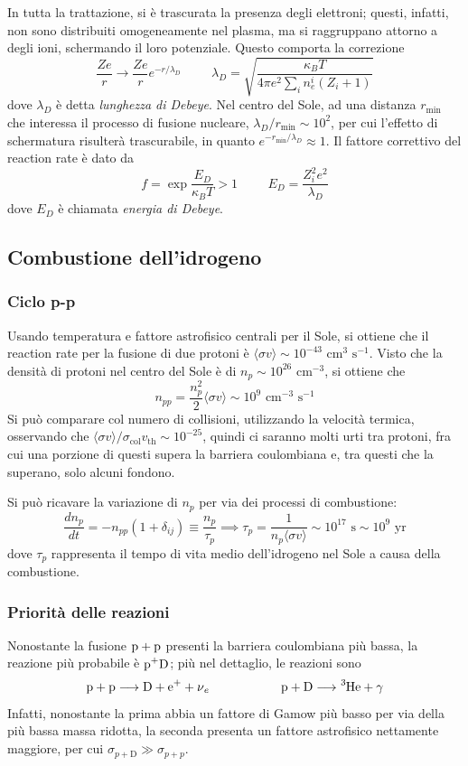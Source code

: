 \documentclass[11pt, a4paper]{scrartcl}
\theoremstyle{style}
\theoremstyle{style1}
\numberwithin{equation}{subsection}
\begin{document}
In tutta la trattazione, si \`e trascurata la presenza degli elettroni; questi, infatti, non sono distribuiti omogeneamente nel plasma, ma si raggruppano attorno a degli ioni, schermando il loro potenziale.
Questo comporta la correzione 
\[
\frac{Ze}{r} \longrightarrow \frac{Ze}{r} e^{-r / \lambda _D} \hspace{1cm} \lambda _D = \sqrt{\frac{\kappa _B T}{4 \pi e^2 \sum_{i}^{} n_e^i (Z_i+1)}} 
\] 
dove $\lambda _D$ \`e detta \textit{lunghezza di Debeye}.
Nel centro del Sole, ad una distanza $r_\text{min}$ che interessa il processo di fusione nucleare, $\lambda _D / r_\text{min}\sim 10^2$, per cui l'effetto di schermatura risulter\`a trascurabile, in quanto $e^{- r_\text{min} / \lambda _D} \approx 1$.
Il fattore correttivo del reaction rate \`e dato da
\[
f = \exp \frac{E_D}{ \kappa _B T } > 1 \hspace{1cm} E_D = \frac{Z_i^2 e^2}{\lambda _D}
\] 
dove $E_D$ \`e chiamata \textit{energia di Debeye}.

\subsection{Combustione dell'idrogeno}
\subsubsection{Ciclo p-p}
Usando temperatura e fattore astrofisico centrali per il Sole, si ottiene che il reaction rate per la fusione di due protoni \`e $\langle \sigma v \rangle \sim 10^{-43} \text{ cm}^3 \text{ s}^{-1}$.
Visto che la densit\`a di protoni nel centro del Sole \`e di $n_p \sim 10^{26} \text{ cm}^{-3}$, si ottiene che
\[
n_{p p} = \frac{n_p^2}{2} \langle \sigma v \rangle \sim 10^{9} \text{ cm}^{-3} \text{ s}^{-1}
\] 
Si pu\`o comparare col numero di collisioni, utilizzando la velocit\`a termica, osservando che $\langle \sigma v \rangle / \sigma _\text{col} v_\text{th} \sim 10^{-25}$, quindi ci saranno molti urti tra protoni, fra cui una porzione di questi supera la barriera coulombiana e, tra questi che la superano, solo alcuni fondono.

Si pu\`o ricavare la variazione di $n_p$ per via dei processi di combustione:
\[
\frac{d n_p}{d t} = - n_{pp} (1+ \delta _{ij} ) \equiv \frac{n_p}{\tau _p}\implies \tau _p = \frac{1}{n_p \langle \sigma v \rangle} \sim 10^{17} \text{ s} \sim 10^{9}\text{ yr}
\] 
dove $\tau _p$ rappresenta il tempo di vita medio dell'idrogeno nel Sole a causa della combustione.
\subsubsection{Priorit\`a delle reazioni}
Nonostante la fusione $\ce{p + p}$ presenti la barriera coulombiana pi\`u bassa, la reazione pi\`u probabile \`e $\ce{p+D}$; pi\`u nel dettaglio, le reazioni sono
\[
	\ce{p + p} \longrightarrow \ce{D + e+ + \nu _e} \hspace{2cm} \ce{p + D} \longrightarrow  \ce{^{3}He + \gamma}
\] 
Infatti, nonostante la prima abbia un fattore di Gamow pi\`u basso per via della pi\`u bassa massa ridotta, la seconda presenta un fattore astrofisico nettamente maggiore, per cui $\sigma _{p + \mathrm{D} } \gg \sigma _{p +p} $.
\end{document}

